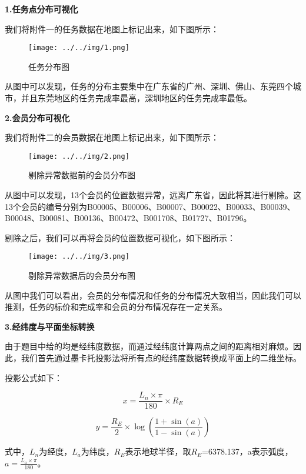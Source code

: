 \documentclass[withoutpreface,bwprint]{cumcmthesis} %
\begin{document}
\textbf{1.任务点分布可视化}

我们将附件一的任务数据在地图上标记出来，如下图所示：

\begin{figure}[H]
	\small
	\centering
	\texttt{[image: ../../img/1.png]}
	\caption{任务分布图} 
\end{figure}

从图中可以发现，任务的分布主要集中在广东省的广州、深圳、佛山、东莞四个城市，并且东莞地区的任务完成率最高，深圳地区的任务完成率最低。

\textbf{2.会员分布可视化}

我们将附件二的会员数据在地图上标记出来，如下图所示：

\begin{figure}[H]
	\small
	\centering
	\texttt{[image: ../../img/2.png]}
	\caption{剔除异常数据前的会员分布图} 
\end{figure}

从图中可以发现，13个会员的位置数据异常，远离广东省，因此将其进行剔除。这13个会员的编号分别为B00005、B00006、B00007、B00022、B00033、B00039、B00048、B00081、B00136、B00472、B001708、B01727、B01796。

剔除之后，我们可以再将会员的位置数据可视化，如下图所示：
\begin{figure}[H]
	\small
	\centering
	\texttt{[image: ../../img/3.png]}
	\caption{剔除异常数据后的会员分布图} 
\end{figure}

从图中我们可以看出，会员的分布情况和任务的分布情况大致相当，因此我们可以推测，任务的标价和完成率和会员的分布情况存在一定关系。


\textbf{3.经纬度与平面坐标转换}

由于题目中给的均是经纬度数据，而通过经纬度计算两点之间的距离相对麻烦。因此，我们首先通过墨卡托投影法将所有点的经纬度数据转换成平面上的二维坐标。

投影公式如下：

\begin{equation}
x = \frac{{{L_n} \times \pi }}{{180}} \times {R_E}
\end{equation}

\begin{equation}
y = \frac{{{R_E}}}{2} \times \log (\frac{{1 + \sin (a)}}{{1 - \sin (a)}})
\end{equation}

式中，${L_n}$为经度，${L_a}$为纬度，${R_E}$表示地球半径，取${R_E}$=6378.137，a表示弧度，${a = \frac{{{L_a} \times \pi }}{{180}}}$。
\end{document}
